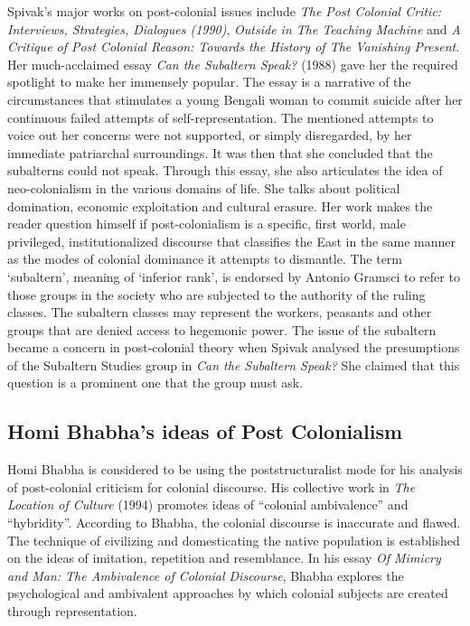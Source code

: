 Spivak’s major works on post-colonial issues include \emph{The Post Colonial Critic: Interviews, Strategies, Dialogues (1990)}, \emph{Outside in The Teaching Machine} and \emph{A Critique of Post Colonial Reason: Towards the History of The Vanishing Present}. Her much-acclaimed essay \emph{Can the Subaltern Speak?} (1988) gave her the required spotlight to make her immensely popular. The essay is a narrative of the circumstances that stimulates a young Bengali woman to commit suicide after her continuous failed attempts of self-representation. The mentioned attempts to voice out her concerns were not supported, or simply disregarded, by her immediate patriarchal surroundings. It was then that she concluded that the subalterns could not speak. Through this essay, she also articulates the idea of neo-colonialism in the various domains of life. She talks about political domination, economic exploitation and cultural erasure. Her work makes the reader question himself if post-colonialism is a specific, first world, male privileged, institutionalized discourse that classifies the East in the same manner as the modes of colonial dominance it attempts to dismantle. The term ‘subaltern’, meaning of ‘inferior rank’, is endorsed by Antonio Gramsci to refer to those groups in the society who are subjected to the authority of the ruling classes. The subaltern classes may represent the workers, peasants and other groups that are denied access to hegemonic power. The issue of the subaltern became a concern in post-colonial theory when Spivak analysed the presumptions of the Subaltern Studies group in \emph{Can the Subaltern Speak?} She claimed that this question is a prominent one that the group must ask.

\subsection{Homi Bhabha’s ideas of Post Colonialism}

Homi Bhabha is considered to be using the poststructuralist mode for his analysis of post-colonial criticism for colonial discourse. His collective work in \emph{The Location of Culture} (1994) promotes ideas of “colonial ambivalence” and “hybridity”. According to Bhabha, the colonial discourse is inaccurate and flawed. The technique of civilizing and domesticating the native population is established on the ideas of imitation, repetition and resemblance. In his essay \emph{Of Mimicry and Man: The Ambivalence of Colonial Discourse}, Bhabha explores the psychological and ambivalent approaches by which colonial subjects are created through representation.

